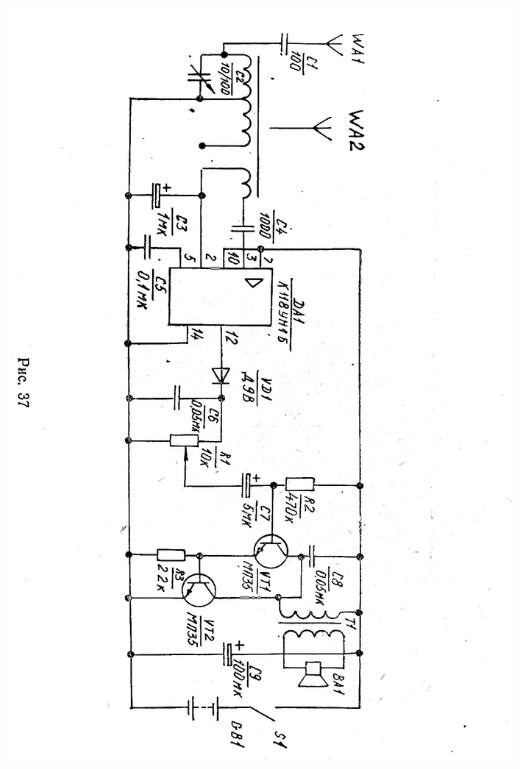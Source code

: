 \documentclass[12pt]{article}
\begin{document}
\includegraphics[scale=0.35, angle=180]{Fig37}

\newpage
\end{document}
